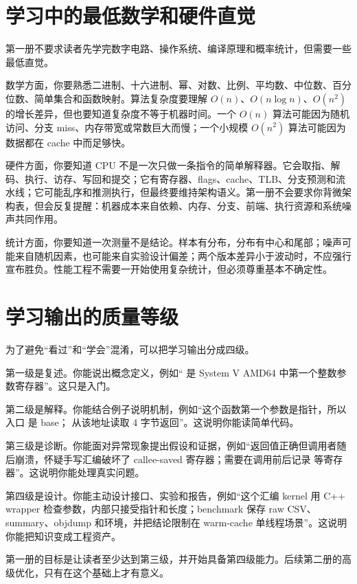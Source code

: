 \section{学习中的最低数学和硬件直觉}

第一册不要求读者先学完数字电路、操作系统、编译原理和概率统计，但需要一些最低直觉。

数学方面，你要熟悉二进制、十六进制、幂、对数、比例、平均数、中位数、百分位数、简单集合和函数映射。算法复杂度要理解 \(O(n)\)、\(O(n \log n)\)、\(O(n^2)\) 的增长差异，但也要知道复杂度不等于机器时间。一个 \(O(n)\) 算法可能因为随机访问、分支 miss、内存带宽或常数巨大而慢；一个小规模 \(O(n^2)\) 算法可能因为数据都在 cache 中而足够快。

硬件方面，你要知道 CPU 不是一次只做一条指令的简单解释器。它会取指、解码、执行、访存、写回和提交；它有寄存器、flags、cache、TLB、分支预测和流水线；它可能乱序和推测执行，但最终要维持架构语义。第一册不会要求你背微架构表，但会反复提醒：机器成本来自依赖、内存、分支、前端、执行资源和系统噪声共同作用。

统计方面，你要知道一次测量不是结论。样本有分布，分布有中心和尾部；噪声可能来自随机因素，也可能来自实验设计偏差；两个版本差异小于波动时，不应强行宣布胜负。性能工程不需要一开始使用复杂统计，但必须尊重基本不确定性。

\section{学习输出的质量等级}

为了避免“看过”和“学会”混淆，可以把学习输出分成四级。

第一级是复述。你能说出概念定义，例如“ 是 System V AMD64 中第一个整数参数寄存器”。这只是入门。

第二级是解释。你能结合例子说明机制，例如“这个函数第一个参数是指针，所以入口  是 base； 从该地址读取 4 字节返回”。这说明你能读简单代码。

第三级是诊断。你能面对异常现象提出假设和证据，例如“返回值正确但调用者随后崩溃，怀疑手写汇编破坏了 callee-saved 寄存器；需要在调用前后记录  等寄存器”。这说明你能处理真实问题。

第四级是设计。你能主动设计接口、实验和报告，例如“这个汇编 kernel 用 C++ wrapper 检查参数，内部只接受指针和长度；benchmark 保存 raw CSV、summary、objdump 和环境，并把结论限制在 warm-cache 单线程场景”。这说明你能把知识变成工程资产。

第一册的目标是让读者至少达到第三级，并开始具备第四级能力。后续第二册的高级优化，只有在这个基础上才有意义。

